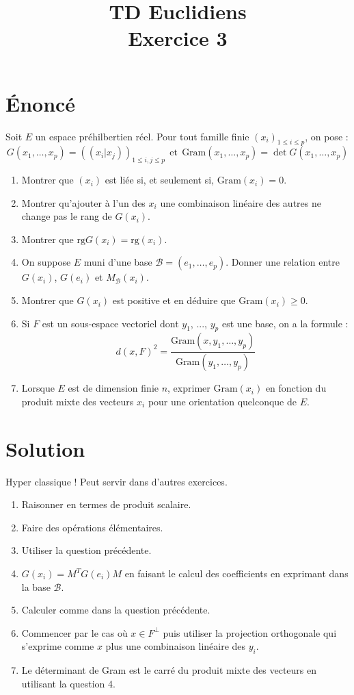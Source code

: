 \documentclass[french]{article}
\title{TD Euclidiens\\ Exercice 3}
\date{}
\begin{document}
\maketitle

\section{Énoncé}
Soit $E$ un espace préhilbertien réel. Pour tout famille finie $(x_i)_{1\leqslant i\leqslant p}$, on pose : $$G(x_1,\ldots,x_p)=((x_i|x_j))_{1\leqslant i,j\leqslant p}\ \ \text{et} \ \ \text{Gram}(x_1,\ldots,x_p)=\det G(x_1,\ldots,x_p)$$
\begin{enumerate}
	\item Montrer que $(x_i)$ est liée si, et seulement si, $\text{Gram}(x_i)=0$.
	\item Montrer qu'ajouter à l'un des $x_i$ une combinaison linéaire des autres ne change pas le rang de $G(x_i)$.
	\item Montrer que $\text{rg}G(x_i)=\text{rg}(x_i)$.
	\item On suppose $E$ muni d'une base $\mathcal{B}=(e_1,\ldots,e_p)$. Donner une relation entre $G(x_i)$, $G(e_i)$ et $M_\mathcal{B}(x_i)$.
	\item Montrer que $G(x_i)$ est positive et en déduire que $\text{Gram}(x_i)\geqslant0$.
	\item Si $F$ est un sous-espace vectoriel dont $y_1$, ..., $y_p$ est une base, on a la formule : $$d(x,F)^2=\frac{\text{Gram}(x,y_1,\ldots,y_p)}{\text{Gram}(y_1,\ldots,y_p)}$$
	\item Lorsque $E$ est de dimension finie $n$, exprimer $\text{Gram}(x_i)$ en fonction du produit mixte des vecteurs $x_i$ pour une orientation quelconque de $E$.
\end{enumerate}
\section{Solution}
Hyper classique ! Peut servir dans d'autres exercices.
\begin{enumerate}
	\item Raisonner en termes de produit scalaire.
	\item Faire des opérations élémentaires.
	\item Utiliser la question précédente.
	\item $G(x_i)=M^TG(e_i)M$ en faisant le calcul des coefficients en exprimant dans la base $\mathcal{B}$.
	\item Calculer comme dans la question précédente.
	\item Commencer par le cas où $x\in F^\bot$ puis utiliser la projection orthogonale qui s'exprime comme $x$ plus une combinaison linéaire des $y_i$.
	\item Le déterminant de Gram est le carré du produit mixte des vecteurs en utilisant la question 4.
\end{enumerate}
\end{document}

